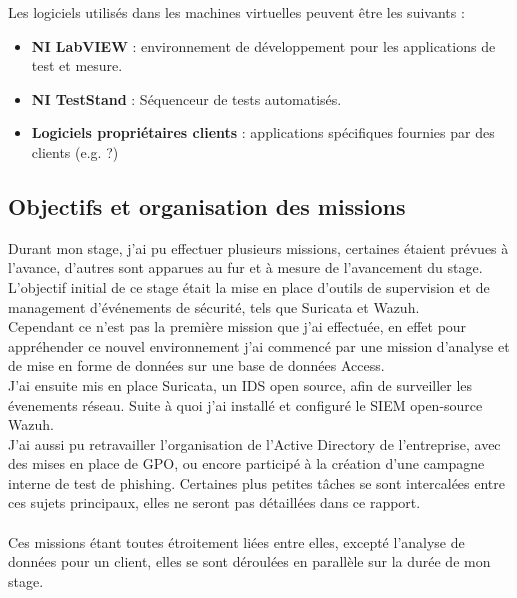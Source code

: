 \documentclass[a4paper, 11pt]{article}
\begin{document}
Les logiciels utilisés dans les machines virtuelles peuvent être les suivants :
\par\bigskip

\begin{itemize}
  \item[$\bullet$] \textbf{NI LabVIEW} : environnement de développement pour les applications de test et mesure.
  \item[$\bullet$] \textbf{NI TestStand} : Séquenceur de tests automatisés.
  \item[$\bullet$] \textbf{Logiciels propriétaires clients} : applications spécifiques fournies par des clients (e.g. ?)
\end{itemize}

\subsection{Objectifs et organisation des missions}
\par\bigskip
Durant mon stage, j'ai pu effectuer plusieurs missions, certaines étaient prévues à l'avance, d'autres sont apparues au fur et à mesure de l'avancement du stage.
L'objectif initial de ce stage était la mise en place d'outils de supervision et de management d'événements de sécurité, tels que Suricata et Wazuh.\\
Cependant ce n'est pas la première mission que j'ai effectuée, en effet pour appréhender ce nouvel environnement j'ai commencé par une mission d'analyse et de mise en forme de données sur une base de données Access.\\
J'ai ensuite mis en place Suricata, un IDS open source, afin de surveiller les évenements réseau. Suite à quoi j'ai installé et configuré le SIEM open-source Wazuh.\\
J'ai aussi pu retravailler l'organisation de l'Active Directory de l'entreprise, avec des mises en place de GPO, ou encore participé à la création d'une campagne interne de test de phishing. Certaines plus petites tâches se sont intercalées entre ces sujets principaux, elles ne seront pas détaillées dans ce rapport.\\
\\
Ces missions étant toutes étroitement liées entre elles, excepté l'analyse de données pour un client, elles se sont déroulées en parallèle sur la durée de mon stage.
\par\bigskip
\end{document}
